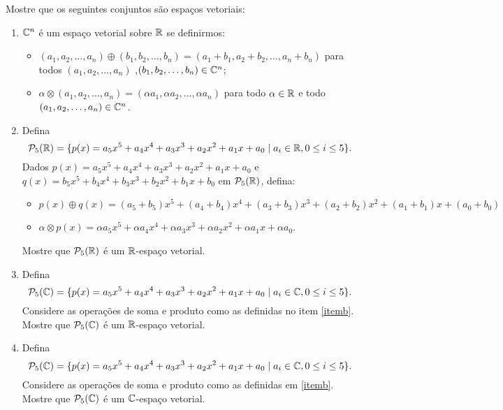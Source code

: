 \documentclass[12pt]{exam}
\begin{document}
\begin{exercicio}
  Mostre que os seguintes conjuntos s\~ao espa\c{c}os vetoriais:
  \begin{enumerate}[label={\alph*})]
    \item $\mathbb{C}^n$ \'e um espa\c{c}o vetorial sobre $\mathbb{R}$ se definirmos:
    \begin{itemize}
      \item $(a_1, a_2, \dots, a_n) \oplus (b_1, b_2, \dots,b_n) = (a_1 + b_1, a_2 + b_2,\dots, a_n + b_n)$ para todos $(a_1, a_2, \dots,a_n)$ ,$(b_1, b_2, \dots,b_n) \in \mathbb{C}^n$;

      \item $\alpha \otimes (a_1, a_2, \dots,a_n) = (\alpha a_1, \alpha a_2, \dots, \alpha a_n)$ para todo $\alpha \in \mathbb{R}$ e todo $(a_1, a_2, \dots, a_n) \in \mathbb{C}^n$.
    \end{itemize}

    \item\label{itemb} Defina
    \[
      \mathcal{P}_5(\mathbb{R}) = \{ p(x) = a_5x^5 + a_4x^4 + a_3x^3 + a_2x^2 + a_1x + a_0 \mid a_i \in \mathbb{R}, 0 \le i \le 5 \}.
    \]
     Dados $p(x) = a_5x^5 + a_4x^4 + a_3x^3 + a_2x^2 + a_1x + a_0$ e $q(x) = b_5x^5 + b_4x^4 + b_3x^3 + b_2x^2 + b_1x + b_0$ em $\mathcal{P}_5(\mathbb{R})$, defina:
    \begin{itemize}
      \item $p(x) \oplus q(x) =  (a_5 + b_5)x^5 + (a_4 + b_4)x^4 + (a_3 + b_ 3)x^3 + (a_2 + b_2)x^2 + (a_1 + b_1)x + (a_0 + b_0)$
      \item $\alpha\otimes p(x) = \alpha a_5x^5 + \alpha a_4x^4 + \alpha a_3x^3 + \alpha a_2x^2 + \alpha a_1x + \alpha a_0$.
    \end{itemize}

   Mostre que $\mathcal{P}_5(\mathbb{R})$ \'e um $\mathbb{R}$-espa\c{c}o vetorial.

    \item Defina
    \[
      \mathcal{P}_5(\mathbb{C}) = \{ p(x) = a_5x^5 + a_4x^4 + a_3x^3 + a_2x^2 + a_1x + a_0 \mid a_i \in \mathbb{C}, 0 \le i \le 5 \}.
    \]
    Considere as opera\c{c}\~oes de soma e produto como as definidas no item \ref{itemb}. Mostre que $\mathcal{P}_5(\mathbb{C})$ \'e um $\mathbb{R}$-espa\c{c}o vetorial.

    \item Defina
    \[
      \mathcal{P}_5(\mathbb{C}) = \{ p(x) = a_5x^5 + a_4x^4 + a_3x^3 + a_2x^2 + a_1x + a_0 \mid a_i \in \mathbb{C}, 0 \le i \le 5 \}.
    \]
    Considere as opera\c{c}\~oes de soma e produto como as definidas em \ref{itemb}. Mostre que $\mathcal{P}_5(\mathbb{C})$ \'e um $\mathbb{C}$-espa\c{c}o vetorial.


\end{enumerate}
\end{exercicio}
\end{document}
